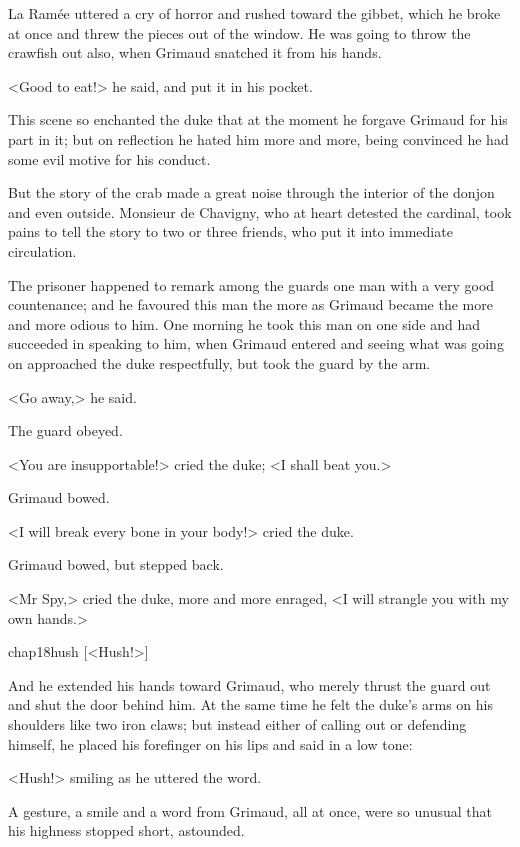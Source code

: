 La Ramée uttered a cry of horror and rushed toward the gibbet, which he broke at once and threw the pieces out of the window. He was going to throw the crawfish out also, when Grimaud snatched it from his hands.

<Good to eat!> he said, and put it in his pocket.

This scene so enchanted the duke that at the moment he forgave Grimaud for his part in it; but on reflection he hated him more and more, being convinced he had some evil motive for his conduct.

But the story of the crab made a great noise through the interior of the donjon and even outside. Monsieur de Chavigny, who at heart detested the cardinal, took pains to tell the story to two or three friends, who put it into immediate circulation.

The prisoner happened to remark among the guards one man with a very good countenance; and he favoured this man the more as Grimaud became the more and more odious to him. One morning he took this man on one side and had succeeded in speaking to him, when Grimaud entered and seeing what was going on approached the duke respectfully, but took the guard by the arm.

<Go away,> he said.

The guard obeyed.

<You are insupportable!> cried the duke; <I shall beat you.>

Grimaud bowed.

<I will break every bone in your body!> cried the duke.

Grimaud bowed, but stepped back.

<Mr Spy,> cried the duke, more and more enraged, <I will strangle you with my own hands.>

\begin{bwbigpic}
	[\basicscale] 
	{chap18hush}
	[<Hush!>]
\end{bwbigpic}

And he extended his hands toward Grimaud, who merely thrust the guard out and shut the door behind him. At the same time he felt the duke's arms on his shoulders like two iron claws; but instead either of calling out or defending himself, he placed his forefinger on his lips and said in a low tone:

<Hush!> smiling as he uttered the word.

A gesture, a smile and a word from Grimaud, all at once, were so unusual that his highness stopped short, astounded.

